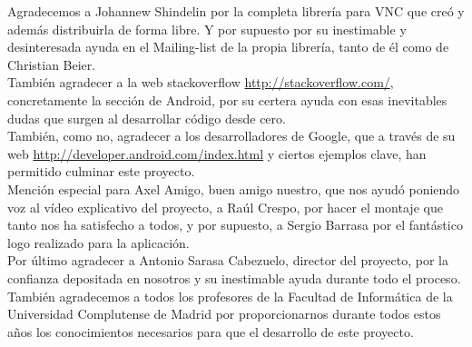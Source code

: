 Agradecemos a Johannew Shindelin por la completa librer\'ia para VNC que cre\'o y adem\'as distribuirla de forma libre. Y por supuesto por su inestimable y desinteresada ayuda en el Mailing-list de la propia librer\'ia, tanto de \'el como de Christian Beier.\\

Tambi\'en agradecer a la web stackoverflow \url{http://stackoverflow.com/}, concretamente la secci\'on de Android, por su certera ayuda con esas inevitables dudas que surgen al desarrollar c\'odigo desde cero.\\

Tambi\'en, como no, agradecer a los desarrolladores de Google, que a trav\'es de su web \url{http://developer.android.com/index.html} y ciertos ejemplos clave, han permitido culminar este proyecto.\\

Menci\'on especial para Axel Amigo, buen amigo nuestro, que nos ayud\'o poniendo voz al v\'ideo explicativo del proyecto, a Ra\'ul Crespo, por hacer el montaje que tanto nos ha satisfecho a todos, y por supuesto, a Sergio Barrasa por el fant\'astico logo realizado para la aplicaci\'on.\\

Por \'ultimo agradecer a Antonio Sarasa Cabezuelo, director del proyecto, por la confianza depositada en nosotros y su inestimable ayuda durante todo el proceso. Tambi\'en agradecemos a todos los profesores de la Facultad de Inform\'atica de la Universidad Complutense de Madrid por proporcionarnos durante todos estos años los conocimientos necesarios para que el desarrollo de este proyecto.